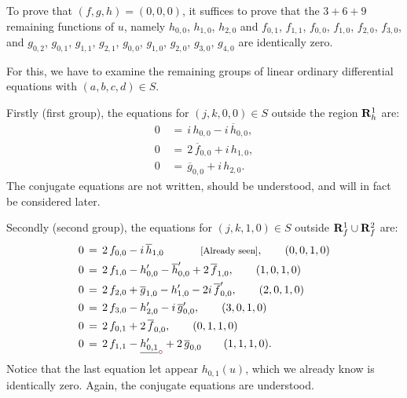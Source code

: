 \documentclass[12pt,twoside,leqno,openany]{amsart}
\begin{document}
To prove that $(f, g, h) = (0, 0, 0)$, it suffices to 
prove that the $3 + 6 + 9$ remaining functions of $u$, namely
$h_{0,0}$, $h_{1,0}$, $h_{2,0}$ 
and $f_{0,1}$, $f_{1,1}$, $f_{0,0}$, $f_{1,0}$, $f_{2,0}$, $f_{3,0}$,
and $g_{0,2}$, $g_{0,1}$, $g_{1,1}$, $g_{2,1}$,
$g_{0,0}$, $g_{1,0}$, $g_{2,0}$, $g_{3,0}$, $g_{4,0}$ 
are identically zero.

For this, we have to examine the remaining groups of
linear ordinary differential equations
with $(a,b,c,d) \in S$.

Firstly (first group), 
the equations for $(j,k,0,0) \in S$ outside the region
${\bf R}_h^1$ are:
\leqnomode{}
\begin{align}
0
&
\,=\,
i\,h_{0,0}
-
i\,\overline{h}_{0,0},
\tag{$0,0,0,0$}
\\
0
&
\,=\,
2\,\overline{f}_{0,0}
+
i\,h_{1,0},
\tag{$1,0,0,0$}
\\
0
&
\,=\,
\overline{g}_{0,0}
+
i\,h_{2,0}.
\tag{$2,0,0,0$}
\end{align}
The conjugate equations are not written, should be understood,
and will in fact be considered later.

Secondly (second group), 
the equations for $(j,k,1,0) \in S$ outside 
${\bf R}_f^1 \cup {\bf R}_f^2$ are:
\leqnomode{}
\begin{align}
0
&
\,=\,
2\,f_{0,0}
-
i\,\overline{h}_{1,0}
\ \ \ \ \ \ \ \ \ \ 
\text{\footnotesize[Already seen]},
\tag{$0,0,1,0$}
\\
0
&
\,=\,
2\,f_{1,0}
-
h_{0,0}'
-
\overline{h}_{0,0}'
+
2\,\overline{f}_{1,0},
\tag{$1,0,1,0$}
\\
0
&
\,=\,
2\,f_{2,0}
+
\overline{g}_{1,0}
-
h_{1,0}'
-
2i\,\overline{f}_{0,0}',
\tag{$2,0,1,0$}
\\
0
&
\,=\,
2\,f_{3,0}
-
h_{2,0}'
-
i\,\overline{g}_{0,0}',
\tag{$3,0,1,0$}
\\
0
&
\,=\,
2\,f_{0,1}
+
2\,\overline{f}_{0,0},
\tag{$0,1,1,0$}
\\
0
&
\,=\,
2\,f_{1,1}
-
\zero{h_{0,1}'}
+
2\,\overline{g}_{0,0}
\tag{$1,1,1,0$}.
\end{align}
Notice that the last equation let appear
$h_{0,1}(u)$, which we already know is identically zero.
Again, the conjugate equations are understood.
\end{document}
